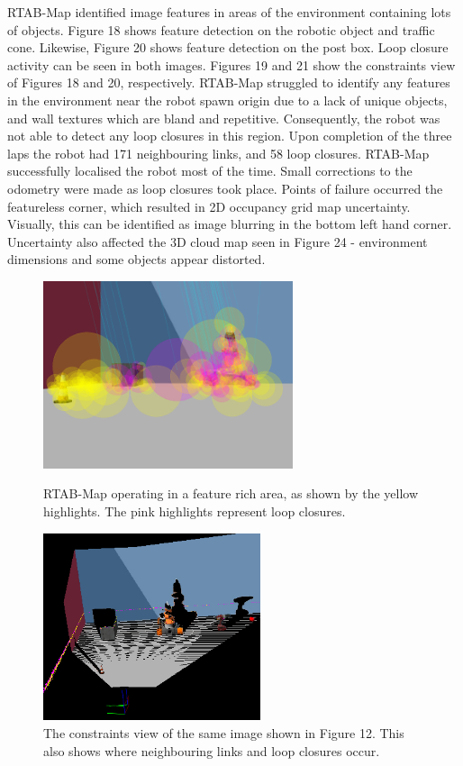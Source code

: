 \documentclass[a4paper]{article}
\begin{document}
RTAB-Map identified image features in areas of the environment containing lots of objects. Figure 18 shows feature detection on the robotic object and traffic cone. Likewise, Figure 20 shows feature detection on the post box. Loop closure activity can be seen in both images. Figures 19 and 21 show the constraints view of Figures 18 and 20, respectively. RTAB-Map struggled to identify any features in the environment near the robot spawn origin due to a lack of unique objects, and wall textures which are bland and repetitive. Consequently, the robot was not able to detect any loop closures in this region. Upon completion of the three laps the robot had 171 neighbouring links, and 58 loop closures. RTAB-Map successfully localised the robot most of the time. Small corrections to the odometry were made as loop closures took place. Points of failure occurred the featureless corner, which resulted in 2D occupancy grid map uncertainty. Visually, this can be identified as image blurring in the bottom left hand corner. Uncertainty also affected the 3D cloud map seen in Figure 24 - environment dimensions and some objects appear distorted.

\begin{figure}[h]
\centering
\begin{minipage}[t]{0.45\textwidth}
\centering
\includegraphics[height=5.5cm]{slam_house_features_corner_1}
\caption{RTAB-Map operating in a feature rich area, as shown by the yellow highlights. The pink highlights represent loop closures.}
\end{minipage}
\hspace{1cm}
\begin{minipage}[t]{0.45\textwidth}
\centering
\includegraphics[height=5.5cm]{slam_house_constraints_1}
\caption{The constraints view of the same image shown in Figure 12. This also shows where neighbouring links and loop closures occur.}
\end{minipage}
\end{figure}
\end{document}
